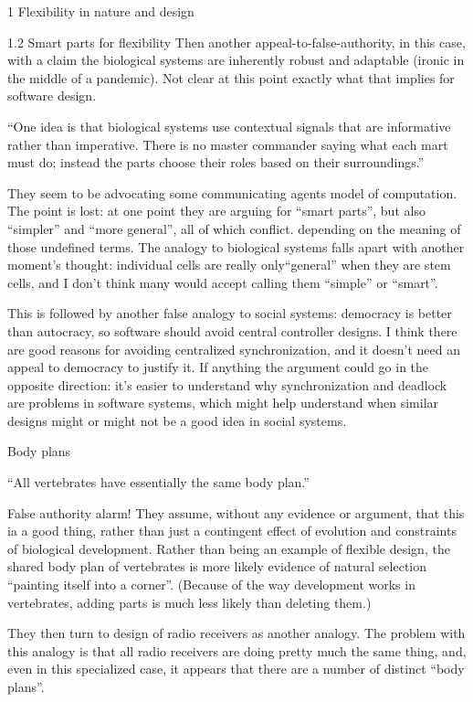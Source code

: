 \documentclass[12pt]{PalisadesLakesBook}
\begin{document}
\begin{plSection}{}
\begin{plSection}{1 Flexibility in nature and design}
\begin{plSection}{1.2 Smart parts for flexibility}
Then another appeal-to-false-authority,
in this case, with a claim the biological systems
are inherently robust and adaptable
(ironic in the middle of a pandemic).
Not clear at this point exactly what that implies for software
design.

``One idea is that biological systems use contextual signals
that are informative rather than imperative.
There is no master commander saying what each mart must do;
instead the parts choose their roles based on their surroundings.''

They seem to be advocating some communicating agents model
of computation.
The point is lost: at one point they are arguing for
``smart parts'', but also ``simpler'' and ``more general'',
all of which conflict. depending on the meaning of those
undefined terms. 
The analogy to biological systems falls apart with another
moment's thought: 
individual cells are really only``general''
when they are stem cells,
and I don't think many would accept calling them ``simple''
or ``smart''.

This is followed by another false analogy to social systems:
democracy is better than autocracy, 
so software should avoid central controller designs.
I think there are good reasons for avoiding 
centralized synchronization,
and it doesn't need an appeal to democracy to justify it.
If anything the argument could go in the opposite direction:
it's easier to understand why synchronization and deadlock
are problems in software systems, 
which might help understand when similar designs 
might or might not be a good idea in social systems.
 
\begin{plSection}{Body plans}

``All vertebrates have essentially the same body plan.''

False authority alarm! 
They assume, without any evidence or argument,
that this ia a good thing, 
rather than just a contingent effect of 
evolution and constraints of biological development.
Rather than being an example of flexible design,
the shared body plan of vertebrates
is more likely evidence of natural selection
``painting itself into a corner''.
(Because of the way development works in vertebrates,
adding parts is much less likely than deleting them.)

They then turn to design of radio receivers as another analogy.
The problem with this analogy is that all radio receivers
are doing pretty much the same thing,
and, even in this specialized case, 
it appears that there are a number of distinct ``body plans''.


\end{plSection}
\end{plSection}
\end{plSection}
\end{plSection}
\end{document}
